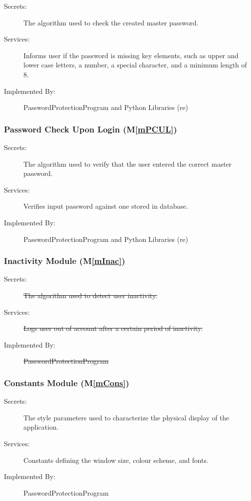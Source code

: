 \documentclass[12pt, titlepage]{article}
\newcommand{\mref}[1]{M\ref{#1}}
\begin{document}
\begin{description}
\item[Secrets:] The algorithm used to check the created master password.
\item[Services:] Informs user if the password is missing key elements, such as upper and lower case letters, a number, a special character, and a minimum length of 8.
\item[Implemented By:] PasswordProtectionProgram and Python Libraries (re)
\end{description}

\subsubsection{Password Check Upon Login (\mref{mPCUL})}

\begin{description}
\item[Secrets:] The algorithm used to verify that the user entered the correct master password.
\item[Services:] Verifies input password against one stored in database.
\item[Implemented By:] PasswordProtectionProgram and Python Libraries (re)
\end{description}

\subsubsection{Inactivity Module (\mref{mInac})}

\begin{description}
\item[Secrets:] \sout{The algorithm used to detect user inactivity.}
\item[Services:] \sout{Logs user out of account after a certain period of inactivity.}
\item[Implemented By:] \sout{PasswordProtectionProgram}
\end{description}

\subsubsection{Constants Module (\mref{mCons})}

\begin{description}
\item[Secrets:] The style parameters used to characterize the physical display of the application.
\item[Services:] Constants defining the window size, colour scheme, and fonts.
\item[Implemented By:] PasswordProtectionProgram
\end{description}
\end{document}
